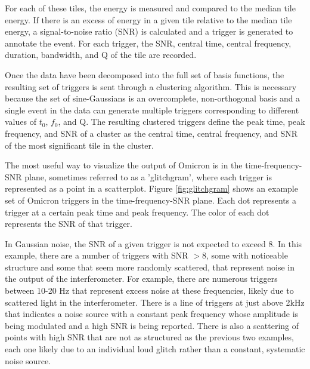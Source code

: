 For each 
of these tiles, the energy is measured and compared to the median tile 
energy. If there is an excess of energy in a given tile relative to the 
median tile energy, a signal-to-noise ratio (SNR) is calculated and a trigger 
is generated to annotate the event. For each trigger, the SNR, central time, 
central frequency, duration, bandwidth, and Q of the tile are recorded. 

Once the data have been decomposed into the full set of basis functions, the 
resulting set of triggers is sent through a clustering algorithm. This is 
necessary because the set of sine-Gaussians is an overcomplete, 
non-orthogonal basis and a single event in the data can generate multiple 
triggers corresponding to different values of $t_0$, $f_0$, and Q. The 
resulting clustered triggers define the peak time, peak frequency, and 
SNR of a cluster as the central time, central frequency, and SNR of the 
most significant tile in the cluster. 

The most useful way to visualize the output of Omicron is in the 
time-frequency-SNR plane, sometimes referred to as a 'glitchgram', 
where each trigger is represented as a point 
in a scatterplot. Figure \ref{fig:glitchgram} shows an example set of 
Omicron triggers in the time-frequency-SNR plane. Each dot represents 
a trigger at a certain peak time and peak frequency. The color of each 
dot represents the SNR of that trigger. 

In Gaussian noise, the SNR of a 
given trigger is not expected to exceed 8. In this example, there are a number 
of triggers with SNR $> 8$, some with noticeable structure and some that seem 
more randomly scattered, that represent noise in the output of the interferometer. 
For example, there are numerous triggers between 10-20 Hz that represent excess noise at 
these frequencies, likely due to scattered light in the 
interferometer. There is a line of triggers at just above 2kHz that indicates 
a noise source with a constant peak frequency whose amplitude is being modulated 
and a high SNR is being reported. There is also a scattering of points with high 
SNR that are not as structured as the previous two examples, each one likely due 
to an individual loud glitch rather than a constant, systematic noise source.


